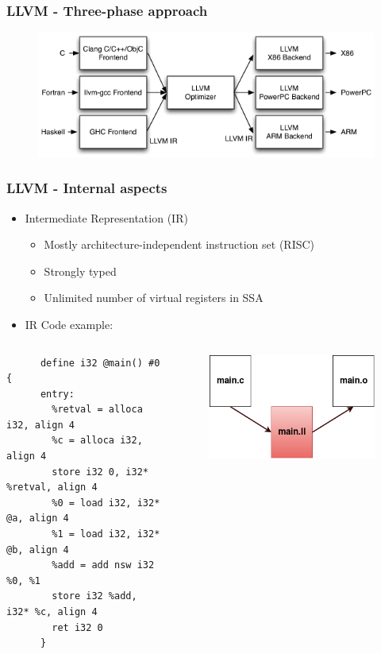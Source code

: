 \documentclass{smilebeamer}
\begin{document}
\begin{frame}
\frametitle{LLVM - Three-phase approach}
\begin{figure}
\includegraphics[width=1\linewidth]{img/llvm_struct.png}
\end{figure}
\end{frame}

\begin{frame}[fragile]
\frametitle{LLVM - Internal aspects}
\begin{itemize}
  \item Intermediate Representation (IR)
  \begin{itemize}
    \item Mostly architecture-independent instruction set (RISC)
    \item Strongly typed
    \item Unlimited number of virtual registers in SSA
  \end{itemize}
  \item IR Code example:
\end{itemize}

\begin{columns}[c]
\begin{lstlisting}
      define i32 @main() #0 {
      entry:
        %retval = alloca i32, align 4
        %c = alloca i32, align 4
        store i32 0, i32* %retval, align 4
        %0 = load i32, i32* @a, align 4
        %1 = load i32, i32* @b, align 4
        %add = add nsw i32 %0, %1
        store i32 %add, i32* %c, align 4
        ret i32 0
      }
\end{lstlisting}
\begin{figure}
\includegraphics[width=0.8\linewidth]{img/ll.png}
\end{figure}
\end{columns}

\end{frame}
\end{document}
